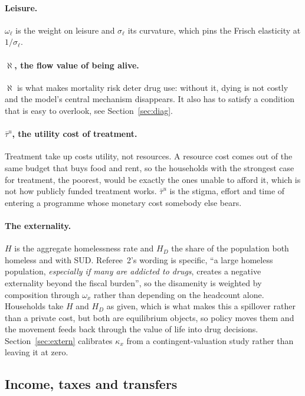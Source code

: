 \documentclass[11pt]{article}
\begin{document}
\paragraph{Leisure.} $\omega_{\ell}$ is the weight on leisure and $\sigma_{\ell}$
its curvature, which pins the Frisch elasticity at $1/\sigma_{\ell}$.

\paragraph{$\aleph$, the flow value of being alive.} $\aleph$ is what makes
mortality risk deter drug use: without it, dying is not costly and the model's
central mechanism disappears. It also has to satisfy a condition that is easy to
overlook, see Section~\ref{sec:diag}.

\paragraph{$\bar\tau^{u}$, the utility cost of treatment.} Treatment take up
costs utility, not resources. A resource cost comes out of the same budget that
buys food and rent, so the households with the strongest case for treatment, the poorest, would be exactly the ones unable to afford it, which is not how
publicly funded treatment works. $\bar\tau^{u}$ is the stigma, effort and time of
entering a programme whose monetary cost somebody else bears.

\paragraph{The externality.} $H$ is the aggregate homelessness rate and $H_D$ the
share of the population both homeless and with SUD. Referee~2's wording is
specific, ``a large homeless population, \emph{especially if many are
addicted to drugs}, creates a negative externality beyond the fiscal burden'', so the disamenity is weighted by composition through $\omega_x$ rather than
depending on the headcount alone. Households take $H$ and $H_D$ as given, which
is what makes this a spillover rather than a private cost, but both are
equilibrium objects, so policy moves them and the movement feeds back through the
value of life into drug decisions. Section~\ref{sec:extern} calibrates
$\kappa_x$ from a contingent-valuation study rather than leaving it at zero.

\subsection{Income, taxes and transfers}
\end{document}
